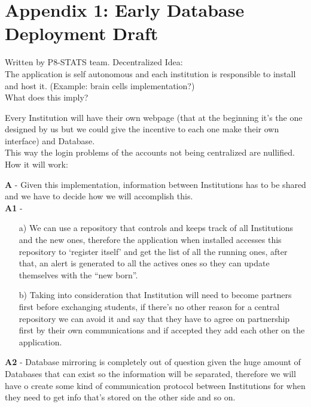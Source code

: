 \chapter{Appendix 1: Early Database Deployment Draft}
Written by P8-STATS team.
\newline \newline
Decentralized Idea:\\
The application is self autonomous and each institution is responsible to
install and host it. (Example: brain cells implementation?)\\

\noindent What does this imply?

\noindent Every Institution will have their own webpage (that at the beginning
it’s the one designed by us but we could give the incentive to each one make
their own interface) and Database.\\
This way the login problems of the accounts not being centralized are
nullified.\\
How it will work:


\textbf{A} - Given this implementation, information between Institutions has to
be shared and we have to decide how we will accomplish this.\\

\textbf{A1} -
\begin{itemize}
\item[a)] We can use a repository that controls and keeps track of all Institutions and
the new ones, therefore the application when installed accesses this repository
to ‘register itself’ and get the list of all the running ones, after that, an
alert is generated to all the actives ones so they can update themselves with
the “new born”.
\item[b)] Taking into consideration that Institution will need to become partners first
before exchanging students, if there’s no other reason for a central repository
we can avoid it and say that they have to agree on partnership first by their
own communications and if accepted they add each other on the application.
\end{itemize}

\textbf{A2} - Database mirroring is completely out of question given the huge
amount of Databases that can exist so the information will be separated,
therefore we will have o create some kind of communication protocol between Institutions for when
they need to get info that’s stored on the other side and so on.\\

